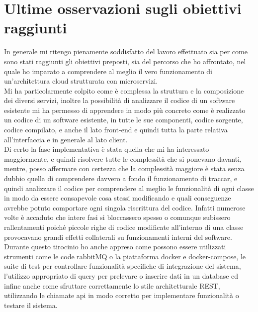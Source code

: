 \documentclass[a4paper,titlepage,12pt]{book}
\begin{document}
{\section{
Ultime osservazioni sugli obiettivi raggiunti}
In generale mi ritengo pienamente soddisfatto del lavoro effettuato sia per come sono stati raggiunti gli obiettivi preposti, sia del percorso che ho affrontato, nel quale ho imparato a comprendere al meglio il vero funzionamento di un'architettura cloud strutturata con microservizi.\\
Mi ha particolarmente colpito come è complessa la struttura e la composizione dei diversi servizi, inoltre la possibilità di analizzare il codice di un software esistente mi ha permesso di apprendere in modo più concreto come è realizzato un codice di un software esistente, in tutte le sue componenti, codice sorgente, codice compilato, e anche il lato front-end e quindi tutta la parte relativa all'interfaccia e in generale al lato client.\\
Di certo la fase implementativa è stata quella che mi ha interessato maggiormente, e quindi risolvere tutte le complessità che si ponevano davanti, mentre, posso affermare con certezza che la complessità maggiore è stata senza dubbio quella di comprendere davvero a fondo il funzionamento di traccar, e quindi analizzare il codice per comprendere al meglio le funzionalità di ogni classe in modo da essere consapevole cosa stessi modificando e quali conseguenze avrebbe potuto comportare ogni singola riscrittura del codice. Infatti numerose volte è accaduto che intere fasi si bloccassero spesso o comunque subissero rallentamenti poiché piccole righe di codice modificate all'interno di una classe provocavano grandi effetti collaterali su funzionamenti interni del software.\\
Durante questo tirocinio ho anche appreso come possono essere utilizzati strumenti come le code rabbitMQ o la piattaforma docker e docker-compose, le suite di test per controllare funzionalità specifiche di integrazione del sistema, l'utilizzo appropriato di query per prelevare o inserire dati in un database ed infine anche come sfruttare correttamente lo stile architetturale REST, utilizzando le chiamate api in modo corretto per implementare funzionalità o testare il sistema.

}
\end{document}
